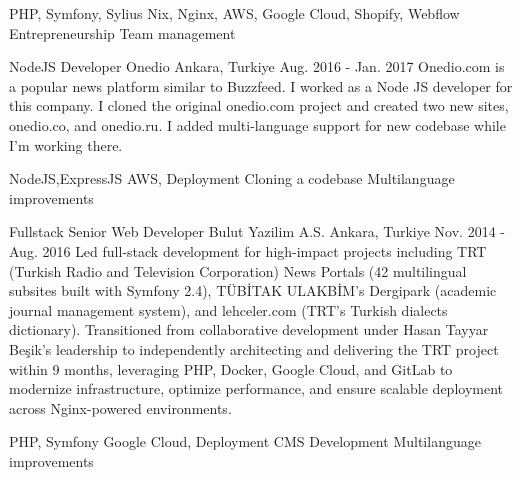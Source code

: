 \begin{cventries}
{    }
    {
      \begin{cvsubentries}%
        \cvsubentry {} {PHP, Symfony, Sylius} {} {} 
        \cvsubentry {} {Nix, Nginx, AWS, Google Cloud, Shopify, Webflow} {} {} 
        \cvsubentry {} {Entrepreneurship} {} {} 
        \cvsubentry {} {Team management} {} {} 
      \end{cvsubentries}
    }
    \cventry
    {NodeJS Developer} %
    {Onedio} %
    {Ankara, Turkiye} %
    {Aug. 2016 - Jan. 2017} %
    {
      Onedio.com is a popular news platform similar to Buzzfeed. I worked as a Node JS developer for this company. I cloned the original onedio.com project and created two new sites, onedio.co, and onedio.ru. I added multi-language support for new codebase while I’m working there.
    }
    {
      \begin{cvsubentries}%
        \cvsubentry {} {NodeJS,ExpressJS} {} {} 
        \cvsubentry {} {AWS, Deployment} {} {} 
        \cvsubentry {} {Cloning a codebase} {} {} 
        \cvsubentry {} {Multilanguage improvements} {} {} 
      \end{cvsubentries}
    }


    \cventry
    {Fullstack Senior Web Developer} %
    {Bulut Yazilim A.S.} %
    {Ankara, Turkiye} %
    {Nov. 2014 - Aug. 2016} %
    {
      Led full-stack development for high-impact projects including TRT (Turkish Radio and Television Corporation) News Portals (42 multilingual subsites built with Symfony 2.4), TÜBİTAK ULAKBİM’s Dergipark (academic journal management system), and lehceler.com (TRT’s Turkish dialects dictionary). Transitioned from collaborative development under Hasan Tayyar Beşik’s leadership to independently architecting and delivering the TRT project within 9 months, leveraging PHP, Docker, Google Cloud, and GitLab to modernize infrastructure, optimize performance, and ensure scalable deployment across Nginx-powered environments.
    }
    {
      \begin{cvsubentries}%
        \cvsubentry {} {PHP, Symfony} {} {} 
        \cvsubentry {} {Google Cloud, Deployment} {} {} 
        \cvsubentry {} {CMS Development} {} {} 
        \cvsubentry {} {Multilanguage improvements} {} {} 
      \end{cvsubentries}
    }


\end{cventries}

